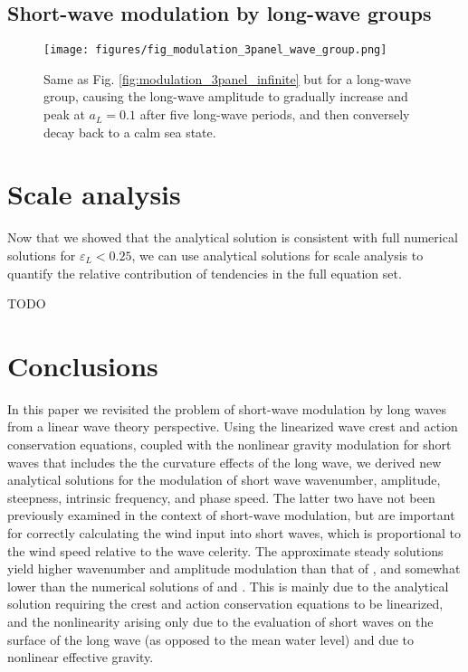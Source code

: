 \documentclass[lineno]{jfm}
\begin{document}
\subsection{Short-wave modulation by long-wave groups}
\label{subsection:wave_groups}

\begin{figure}
\centering
\texttt{[image: figures/fig\_modulation\_3panel\_wave\_group.png]}
\caption{
  Same as Fig. \ref{fig:modulation_3panel_infinite} but for a long-wave group,
  causing the long-wave amplitude to gradually increase and peak at $a_L = 0.1$
  after five long-wave periods, and then conversely decay back to a calm sea state.
}
\label{fig:modulation_3panel_groups}
\end{figure}

\section{Scale analysis}
\label{section:scale_analysis}

Now that we showed that the analytical solution is consistent with full numerical
solutions for $\varepsilon_L < 0.25$, we can use analytical solutions for scale
analysis to quantify the relative contribution of tendencies in the full equation set.

TODO

\section{Conclusions}
\label{section:conclusions}

In this paper we revisited the problem of short-wave modulation by long waves
from a linear wave theory perspective.
Using the linearized wave crest and action conservation equations, coupled with
the nonlinear gravity modulation for short waves that includes the the curvature
effects of the long wave, we derived new analytical solutions for the modulation
of short wave wavenumber, amplitude, steepness, intrinsic frequency, and phase
speed.
The latter two have not been previously examined in the context of short-wave
modulation, but are important for correctly calculating the wind input into
short waves, which is proportional to the wind speed relative to the wave
celerity.
The approximate steady solutions yield higher wavenumber and amplitude
modulation than that of \citet{longuet1960changes}, and somewhat lower than 
the numerical solutions of \citet{longuet1987propagation} and
\citet{zhang1990evolution}.
This is mainly due to the analytical solution requiring the crest and action
conservation equations to be linearized, and the nonlinearity arising only due
to the evaluation of short waves on the surface of the long wave (as opposed to
the mean water level) and due to nonlinear effective gravity.
\end{document}
